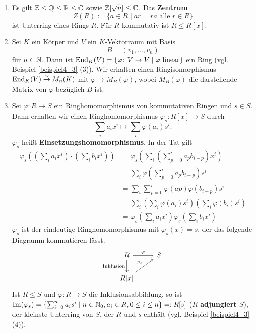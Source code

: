\begin{beispiel}\label{beispiel4_6}
	\begin{enumerate}[label=(\arabic*)]
		\item Es gilt $\mathbb{Z} \leq \mathbb{Q} \leq \mathbb{R} \leq \mathbb{C}$ sowie $\mathbb{Z}[\sqrt{n}] \leq \mathbb{C}$. Das \textbf{Zentrum} 
		\[Z(R) := \{a \in R \mid ar=ra \text{ alle } r \in R\}\]
		ist Unterring eines Rings $R$. Für $R$ kommutativ ist $R \leq R[x]$.
		\item Sei $K$ ein Körper und $V$ ein $K$-Vektorraum mit Basis
		\[B = (v_1, \dots, v_n)\]
		für $n \in \mathbb{N}$. Dann ist $\mathrm{End}_K(V) = \{\varphi\colon V \to V \mid \varphi \text{ linear}\}$ ein Ring (vgl. Beispiel \ref{beispiel4_3} (3)). Wir erhalten einen Ringisomorphismus $\mathrm{End}_K(V) \overset{\sim}{\to} M_n(K)$ mit $\varphi \mapsto M_B(\varphi)$, wobei $M_B(\varphi)$ die darstellende Matrix von $\varphi$ bezüglich $B$ ist.
		\item Sei $\varphi \colon R \to S$ ein Ringhomomorphismus von kommutativen Ringen und $s \in S$. Dann erhalten wir einen Ringhomomorphismus $\varphi_s \colon R[x] \to S$ durch 
		\[\sum_i a_i x^i \mapsto \sum_i \varphi(a_i)s^i.\]
		$\varphi_s$ heißt \textbf{Einsetzungshomomorphismus}. In der Tat gilt 
		\begin{align*}
			\varphi_s\left( \left(\sum_i a_i x^i\right) \cdot \left(\sum_i b_i x^i\right)\right) &= \varphi_s\left(\sum_i \left(\sum_{p=0}^i a_p b_{i-p}\right)x^i\right)\\
			&= \sum_i \varphi\left(\sum_{p=0}^i a_p b_{i-p}\right) s^i\\
			&= \sum_i \sum_{p=0}^i \varphi(ap)\varphi(b_{i-p}) s^i\\
			&= \sum_i \left(\sum_i \varphi(a_i) s^i\right) \left(\sum_{i} \varphi(b_i) s^i\right)\\
			&= \varphi_s\left(\sum_i a_ix^i\right) \varphi_s\left(\sum_i b_ix^i\right)
		\end{align*}
		$\varphi_s$ ist der eindeutige Ringhomomorphismus mit $\varphi_s(x) = s$, der das folgende Diagramm kommutieren lässt.
		\[
		\begin{tikzcd}
			R \arrow{r}{\varphi} \arrow[swap]{d}{\text{Inklusion}} & S \\
			R[x] \arrow{ur}{\varphi_s}
		\end{tikzcd}
		\]
		Ist $R \leq S$ und $\varphi \colon R \to S$ die Inklusionsabbildung, so ist  $\mathrm{Im}(\varphi_s) = \{\sum_{i=0}^n a_i s^i \mid n \in \mathbb{N}_0, a_i \in R, 0 \leq i \leq n\} =: R[s]$ (\glqq\textbf{$R$ adjungiert $S$}\grqq), der kleinste Unterring von $S$, der $R$ und $s$ enthält (vgl. Beispiel \ref{beispiel4_3} (4)). 
		\vspace{0.5cm}
		

\end{enumerate}
\end{beispiel}
